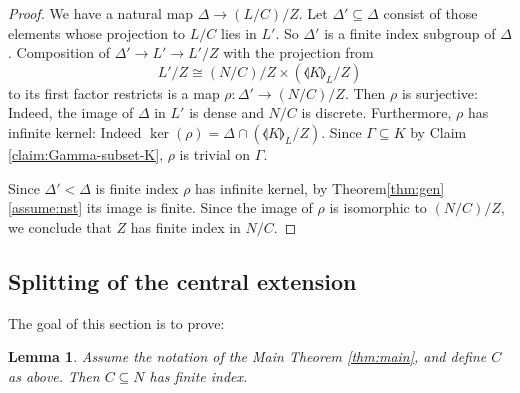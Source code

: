 \documentclass[11pt]{article}
\numberwithin{equation}{section}\providecommand{\llangle}{\langle\!\langle}\providecommand{\rrangle}{\rangle\!\rangle}\providecommand{\Asterisk}{\ast}
\newtheorem{lemma}[thm]{Lemma}
\theoremstyle{definition}
\begin{document}
\begin{proof} We have a natural map $\Delta\to (L/C)/Z$. Let $\Delta'\subseteq \Delta$ consist of those elements whose projection to $L/C$ lies in $L'$. So $\Delta'$ is a finite index subgroup of $\Delta$. Composition of $\Delta'\to L'\to L'/Z$ with the projection from
\[
L'/Z\cong (N/C)/Z \times (\llangle K\rrangle_L / Z)
\]
to its first factor restricts is a map $\rho:\Delta'\to (N/C)/Z$. Then $\rho$ is surjective: Indeed, the image of $\Delta$ in $L'$ is dense and $N/C$ is discrete. Furthermore, $\rho$ has infinite kernel: Indeed $\ker(\rho)=\Delta\cap (\llangle K\rrangle_L/Z)$. Since $\Gamma\subseteq K$ by Claim \ref{claim:Gamma-subset-K}, $\rho$ is trivial on $\Gamma$.

Since $\Delta'<\Delta$ is finite index $\rho$ has infinite kernel, by Theorem\ref{thm:gen}\eqref{assume:nst} its image is finite. Since the image of $\rho$ is isomorphic to $(N/C)/Z$, we conclude that $Z$ has finite index in $N/C$.\end{proof}

\subsection{Splitting of the central extension} \label{sec:abquot}
The goal of this section is to prove:
\begin{lemma} \label{lemma:c-fi} Assume the notation of the Main Theorem \ref{thm:main}, and define $C$ as above. Then $C\subseteq N$ has finite index.\end{lemma}
\end{document}
